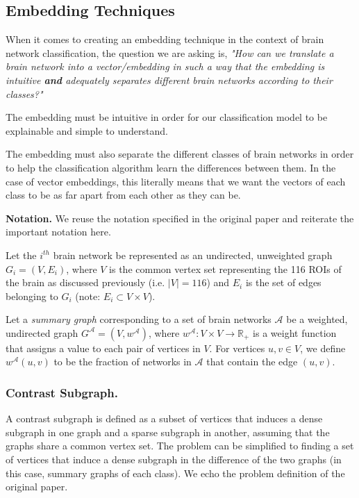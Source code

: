 \documentclass[sigconf]{acmart}
\begin{document}
\subsection{Embedding Techniques} \label{emb-technique}
When it comes to creating an embedding technique in the context of brain network classification, the question we are asking is, \emph{"How can we translate a brain network into a vector/embedding in such a way that the embedding is intuitive \textbf{and} adequately separates different brain networks according to their classes?"}

The embedding must be intuitive in order for our classification model to be explainable and simple to understand.

The embedding must also separate the different classes of brain networks in order to help the classification algorithm learn the differences between them.
In the case of vector embeddings, this literally means that we want the vectors of each class to be as far apart from each other as they can be.

\textbf{Notation.}
We reuse the notation specified in the original paper and reiterate the important notation here.

Let the $i^{th}$ brain network be represented as an undirected, unweighted graph $G_i = (V, E_i)$, where $V$ is the common vertex set representing the 116 ROIs of the brain as discussed previously (i.e. $|V| = 116$) and $E_i$ is the set of edges belonging to $G_i$ (note: $E_i \subset V \times V$).

Let a \emph{summary graph} corresponding to a set of brain networks $\mathcal{A}$ be a weighted, undirected graph $G^{\mathcal{A}} = (V, w^{\mathcal{A}})$, where $w^{\mathcal{A}}: V \times V \rightarrow \mathbb{R}_+$ is a weight function that assigns a value to each pair of vertices in $V$.
For vertices $u,v \in V$, we define $w^{\mathcal{A}}(u,v)$ to be the fraction of networks in $\mathcal{A}$ that contain the edge $(u,v)$.


\subsubsection{Contrast Subgraph.}
A contrast subgraph is defined as a subset of vertices that induces a dense subgraph in one graph and a sparse subgraph in another, assuming that the graphs share a common vertex set.
The problem can be simplified to finding a set of vertices that induce a dense subgraph in the difference of the two graphs (in this case, summary graphs of each class).
We echo the problem definition of the original paper.
\end{document}
